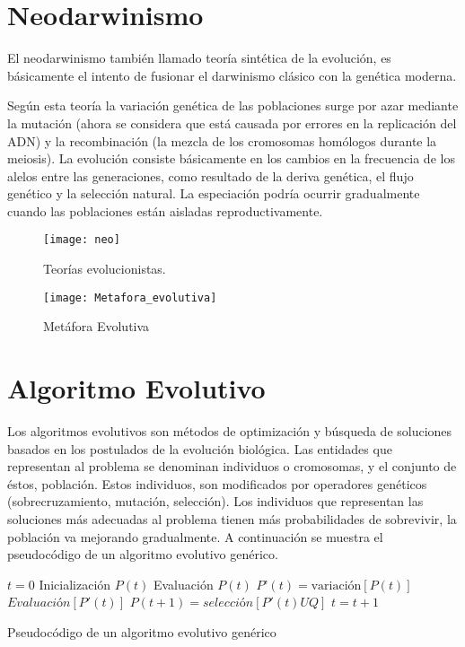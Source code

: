 \documentclass[
]{article}
\begin{document}
\section{Neodarwinismo}
El neodarwinismo también llamado teoría sintética de la evolución, es básicamente el intento de fusionar el darwinismo clásico con la genética moderna.

Según esta teoría la variación genética de las poblaciones surge por azar mediante la mutación (ahora se considera que está causada por errores en la replicación del ADN) y la recombinación (la mezcla de los cromosomas homólogos durante la meiosis). La evolución consiste básicamente en los cambios en la frecuencia de los alelos entre las generaciones, como resultado de la deriva genética, el flujo genético y la selección natural. La especiación podría ocurrir gradualmente cuando las poblaciones están aisladas reproductivamente.

\begin{figure}[h]
  \centering
    \texttt{[image: neo]}
  \caption{Teorías evolucionistas.}
  \label{fig:neo}
\end{figure}


\begin{figure}[h]
  \centering
    \texttt{[image: Metafora\_evolutiva]}
  \caption{Metáfora Evolutiva}
  \label{fig:ejemplo}
\end{figure}

\section{Algoritmo Evolutivo}
Los algoritmos evolutivos son métodos de optimización y búsqueda de soluciones basados en los postulados de la evolución biológica. Las entidades que representan al problema se denominan individuos o cromosomas, y el conjunto de éstos, población. Estos individuos, son modificados por operadores genéticos (sobrecruzamiento, mutación, selección). Los individuos que representan las soluciones más adecuadas al problema tienen más probabilidades de sobrevivir, la población va mejorando gradualmente.
A continuación se muestra el pseudocódigo de un algoritmo evolutivo genérico.
\begin{algorithm}
\begin{algorithmic}[1]
\STATE $t = 0$
\STATE Inicialización $P(t)$
\STATE Evaluación $P(t)$
\REPEAT
\STATE $P\text{'}(t) = \text{variación}[P(t)]$
\STATE $Evaluación[P'(t)]$
\STATE $P(t+1) = selección[P'(t) U Q]$
\STATE $t = t+1$
\end{algorithmic}
\caption{Pseudocódigo de un algoritmo evolutivo genérico}\label{alg:algoritmoEvolutivo}
\end{algorithm}
\end{document}
